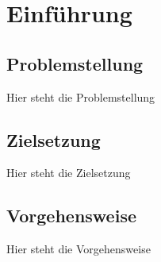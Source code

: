 \chapter{Einführung}

\section{Problemstellung}

Hier steht die Problemstellung

\section{Zielsetzung}

Hier steht die Zielsetzung

\section{Vorgehensweise}

Hier steht die Vorgehensweise